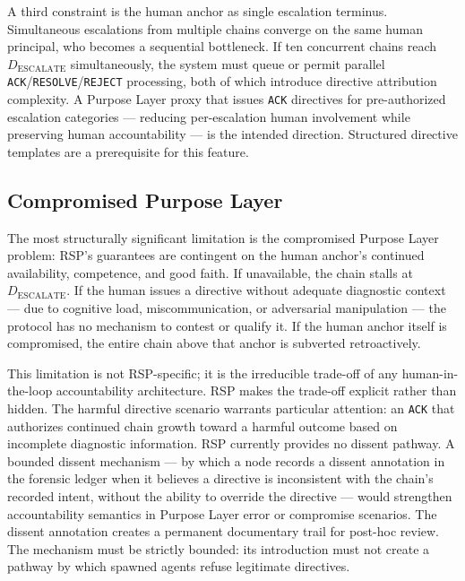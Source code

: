 A third constraint is the human anchor as single escalation terminus. Simultaneous escalations from multiple chains converge on the same human principal, who becomes a sequential bottleneck. If ten concurrent chains reach $D_{\mathrm{ESCALATE}}$ simultaneously, the system must queue or permit parallel \texttt{ACK}/\texttt{RESOLVE}/\texttt{REJECT} processing, both of which introduce directive attribution complexity. A Purpose Layer proxy that issues \texttt{ACK} directives for pre-authorized escalation categories — reducing per-escalation human involvement while preserving human accountability — is the intended direction. Structured directive templates are a prerequisite for this feature.

\subsection{Compromised Purpose Layer}
\label{sec:rs-purpose-compromise}

The most structurally significant limitation is the compromised Purpose Layer problem: RSP's guarantees are contingent on the human anchor's continued availability, competence, and good faith. If unavailable, the chain stalls at $D_{\mathrm{ESCALATE}}$. If the human issues a directive without adequate diagnostic context — due to cognitive load, miscommunication, or adversarial manipulation — the protocol has no mechanism to contest or qualify it. If the human anchor itself is compromised, the entire chain above that anchor is subverted retroactively.

This limitation is not RSP-specific; it is the irreducible trade-off of any human-in-the-loop accountability architecture. RSP makes the trade-off explicit rather than hidden. The harmful directive scenario warrants particular attention: an \texttt{ACK} that authorizes continued chain growth toward a harmful outcome based on incomplete diagnostic information. RSP currently provides no dissent pathway. A bounded dissent mechanism — by which a node records a dissent annotation in the forensic ledger when it believes a directive is inconsistent with the chain's recorded intent, without the ability to override the directive — would strengthen accountability semantics in Purpose Layer error or compromise scenarios. The dissent annotation creates a permanent documentary trail for post-hoc review. The mechanism must be strictly bounded: its introduction must not create a pathway by which spawned agents refuse legitimate directives.

